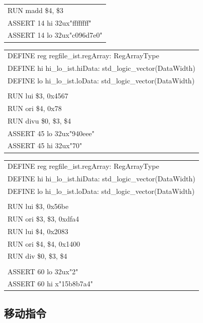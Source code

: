 \documentclass[11pt,utf8]{article}
\begin{document}
{{{\begin{center}
\begin{longtable}{p{15cm}}
		RUN{ }madd{ }\$4,{ }\$3\\
		ASSERT{ }14{ }hi{ }32ux"ffffffff"\\
		ASSERT{ }14{ }lo{ }32ux"c096d7e0"\\
		\hline \end{longtable} \end{center}
\begin{center}	\begin{longtable}{p{15cm}} \hline
		DEFINE{ }reg{ }regfile\_ist.regArray:{ }RegArrayType
		\\
		DEFINE{ }hi{ }hi\_lo\_ist.hiData:{ }std\_logic\_vector(DataWidth)
		\\
		DEFINE{ }lo{ }hi\_lo\_ist.loData:{ }std\_logic\_vector(DataWidth)
		\\
		\\
		RUN{ }lui{ }\$3,{ }0x4567
		\\
		RUN{ }ori{ }\$4,{ }0x78
		\\
		RUN{ }divu{ }\$0,{ }\$3,{ }\$4
		\\
		ASSERT{ }45{ }lo{ }32ux"940eee"
		\\
		ASSERT{ }45{ }hi{ }32ux"70"\\
		\hline \end{longtable} \end{center}
\begin{center}	\begin{longtable}{p{15cm}} \hline
		DEFINE{ }reg{ }regfile\_ist.regArray:{ }RegArrayType
		\\
		DEFINE{ }hi{ }hi\_lo\_ist.hiData:{ }std\_logic\_vector(DataWidth)
		\\
		DEFINE{ }lo{ }hi\_lo\_ist.loData:{ }std\_logic\_vector(DataWidth)
		\\
		\\
		RUN{ }lui{ }\$3,{ }0x56be
		\\
		RUN{ }ori{ }\$3,{ }\$3,{ }0xdfa4
		\\
		RUN{ }lui{ }\$4,{ }0x2083
		\\
		RUN{ }ori{ }\$4,{ }\$4,{ }0x1400
		\\
		RUN{ }div{ }\$0,{ }\$3,{ }\$4
		\\
		\\
		ASSERT{ }60{ }lo{ }32ux"2"
		\\
		ASSERT{ }60{ }hi{ }x"15b8b7a4"\\
		\hline \end{longtable} \end{center}
}

\subsection{移动指令} {
}}}
\end{document}

